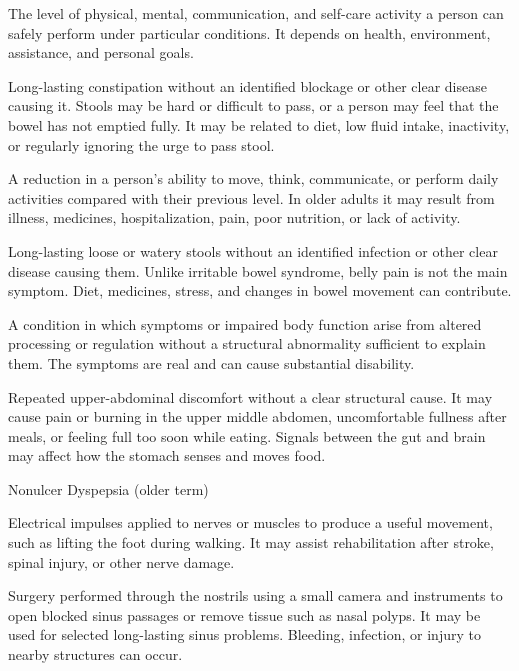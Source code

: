  The level of physical, mental, communication, and self-care activity a person can safely perform under particular conditions. It depends on health, environment, assistance, and personal goals.

 Long-lasting constipation without an identified blockage or other clear disease causing it. Stools may be hard or difficult to pass, or a person may feel that the bowel has not emptied fully. It may be related to diet, low fluid intake, inactivity, or regularly ignoring the urge to pass stool.

 A reduction in a person’s ability to move, think, communicate, or perform daily activities compared with their previous level. In older adults it may result from illness, medicines, hospitalization, pain, poor nutrition, or lack of activity.

 Long-lasting loose or watery stools without an identified infection or other clear disease causing them. Unlike irritable bowel syndrome, belly pain is not the main symptom. Diet, medicines, stress, and changes in bowel movement can contribute.

 A condition in which symptoms or impaired body function arise from altered processing or regulation without a structural abnormality sufficient to explain them. The symptoms are real and can cause substantial disability.

 Repeated upper-abdominal discomfort without a clear structural cause. It may cause pain or burning in the upper middle abdomen, uncomfortable fullness after meals, or feeling full too soon while eating. Signals between the gut and brain may affect how the stomach senses and moves food.

\synonyms
Nonulcer Dyspepsia (older term)

 Electrical impulses applied to nerves or muscles to produce a useful movement, such as lifting the foot during walking. It may assist rehabilitation after stroke, spinal injury, or other nerve damage.

 Surgery performed through the nostrils using a small camera and instruments to open blocked sinus passages or remove tissue such as nasal polyps. It may be used for selected long-lasting sinus problems. Bleeding, infection, or injury to nearby structures can occur.

